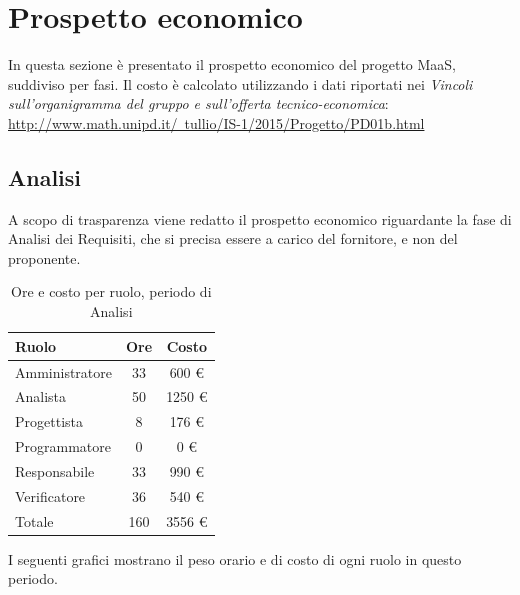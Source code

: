 \section{Prospetto economico}
In questa sezione è presentato il prospetto economico del progetto MaaS, suddiviso per fasi. Il costo è calcolato utilizzando i dati
riportati nei \textit{Vincoli sull’organigramma del gruppo e sull’offerta tecnico-economica}:
\href{http://www.math.unipd.it/~tullio/IS-1/2015/Progetto/PD01b.html}{http://www.math.unipd.it/~tullio/IS-1/2015/Progetto/PD01b.html}


\subsection{Analisi}
A scopo di trasparenza viene redatto il prospetto economico riguardante la fase di Analisi dei Requisiti, che si precisa essere a carico del fornitore, e non del proponente.

\begin{table}[H]
	\centering
	\begin{tabular}{ l c c }
		\textbf{Ruolo} & \textbf{Ore} & \textbf{Costo} \\
		\hline
		Amministratore & 33 & 600 \euro{} \\
		Analista & 50 & 1250 \euro{} \\
		Progettista & 8 & 176 \euro{} \\
		Programmatore & 0 & 0 \euro{} \\
		Responsabile & 33 & 990 \euro{} \\
		Verificatore & 36 & 540 \euro{} \\
		\hline
		Totale & 160 & 3556 \euro{} \\
		\hline
	\end{tabular}
	\caption{Ore e costo per ruolo, periodo di Analisi}
\end{table}

I seguenti grafici mostrano il peso orario e di costo di ogni ruolo in questo periodo.


